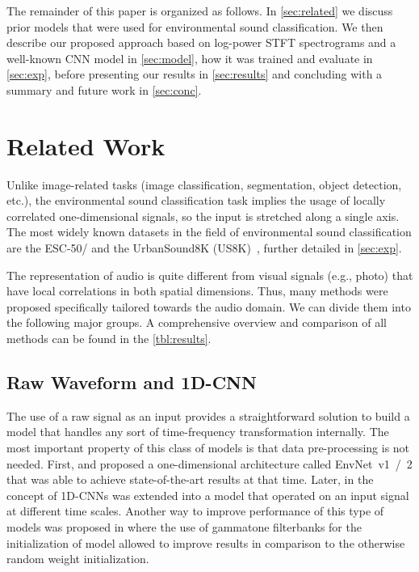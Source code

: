\documentclass[a4paper,conference]{IEEEtran}
\begin{document}
The remainder of this paper is organized as follows.
In \autoref{sec:related} we discuss prior models that were used for environmental sound classification.
We then describe our proposed approach based on log-power STFT spectrograms and a well-known CNN model in \autoref{sec:model}, how it was trained and evaluate in \autoref{sec:exp}, before presenting our results in \autoref{sec:results} and concluding with a summary and future work in \autoref{sec:conc}.


\section{Related Work} \label{sec:related}

Unlike image-related tasks (image classification, segmentation, object detection, etc.), the environmental sound classification task implies the usage of locally correlated one-dimensional signals, so the input is stretched along a single axis.
The most widely known datasets in the field of environmental sound classification are the \mbox{ESC-50\:/} \cite{piczak2015esc} and the UrbanSound8K (US8K)~\cite{salamon2014us8k}, further detailed in \autoref{sec:exp}.

The representation of audio is quite different from visual signals (e.g., photo) that have local correlations in both spatial dimensions.
Thus, many methods were proposed specifically tailored towards the audio domain.
We can divide them into the following major groups.
A comprehensive overview and comparison of all methods can be found in the \autoref{tbl:results}.

\subsection{Raw Waveform and 1D-CNN} \label{ssec:raw_cnn}
The use of a raw signal as an input provides a straightforward solution to build a model that handles any sort of time-frequency transformation internally.
The most important property of this class of models is that data pre-processing is not needed.
First, \cite{tokozume2017envnet} and \cite{tokozume2017envnetv2} proposed a one-dimensional architecture called \mbox{EnvNet v1 / 2} that was able to achieve state-of-the-art results at that time.
Later, in \cite{zhu2018multires} the concept of 1D-CNNs was extended into a model that operated on an input signal at different time scales.
Another way to improve performance of this type of models was proposed in \cite{abdoli2019cnn1d} where the use of gammatone filterbanks for the initialization of model allowed to improve results in comparison to the otherwise random weight initialization.
\end{document}
